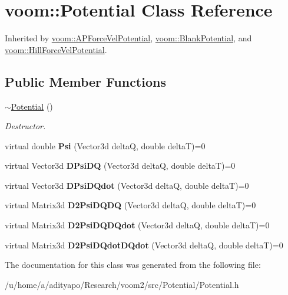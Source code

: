 \hypertarget{classvoom_1_1_potential}{
\section{voom::Potential Class Reference}
\label{classvoom_1_1_potential}
}


Inherited by \hyperlink{classvoom_1_1_a_p_force_vel_potential}{voom::APForceVelPotential}, \hyperlink{classvoom_1_1_blank_potential}{voom::BlankPotential}, and \hyperlink{classvoom_1_1_hill_force_vel_potential}{voom::HillForceVelPotential}.\subsection*{Public Member Functions}
\begin{DoxyCompactItemize}
\item 
\hypertarget{classvoom_1_1_potential_a1c820892790fc87023676111a1e6abe0}{
\hyperlink{classvoom_1_1_potential_a1c820892790fc87023676111a1e6abe0}{$\sim$Potential} ()}
\label{classvoom_1_1_potential_a1c820892790fc87023676111a1e6abe0}

\begin{DoxyCompactList}\small\item\em Destructor. \item\end{DoxyCompactList}\item 
\hypertarget{classvoom_1_1_potential_ac437b1b4d2ad0350997a1dbea4fcdeac}{
virtual double {\bfseries Psi} (Vector3d deltaQ, double deltaT)=0}
\label{classvoom_1_1_potential_ac437b1b4d2ad0350997a1dbea4fcdeac}

\item 
\hypertarget{classvoom_1_1_potential_abad2ee6466bc79cbe946fa5955e340c3}{
virtual Vector3d {\bfseries DPsiDQ} (Vector3d deltaQ, double deltaT)=0}
\label{classvoom_1_1_potential_abad2ee6466bc79cbe946fa5955e340c3}

\item 
\hypertarget{classvoom_1_1_potential_ac6ad31074134b9b69f6572d27d007393}{
virtual Vector3d {\bfseries DPsiDQdot} (Vector3d deltaQ, double deltaT)=0}
\label{classvoom_1_1_potential_ac6ad31074134b9b69f6572d27d007393}

\item 
\hypertarget{classvoom_1_1_potential_a6d2db4b0825333ff712edca4f6048069}{
virtual Matrix3d {\bfseries D2PsiDQDQ} (Vector3d deltaQ, double deltaT)=0}
\label{classvoom_1_1_potential_a6d2db4b0825333ff712edca4f6048069}

\item 
\hypertarget{classvoom_1_1_potential_a3b8563ea863a70a9dcbd00f78c9932ca}{
virtual Matrix3d {\bfseries D2PsiDQDQdot} (Vector3d deltaQ, double deltaT)=0}
\label{classvoom_1_1_potential_a3b8563ea863a70a9dcbd00f78c9932ca}

\item 
\hypertarget{classvoom_1_1_potential_a310d44589e6ceea0d01fbe60199a4c6e}{
virtual Matrix3d {\bfseries D2PsiDQdotDQdot} (Vector3d deltaQ, double deltaT)=0}
\label{classvoom_1_1_potential_a310d44589e6ceea0d01fbe60199a4c6e}

\end{DoxyCompactItemize}


The documentation for this class was generated from the following file:\begin{DoxyCompactItemize}
\item 
/u/home/a/adityapo/Research/voom2/src/Potential/Potential.h\end{DoxyCompactItemize}
